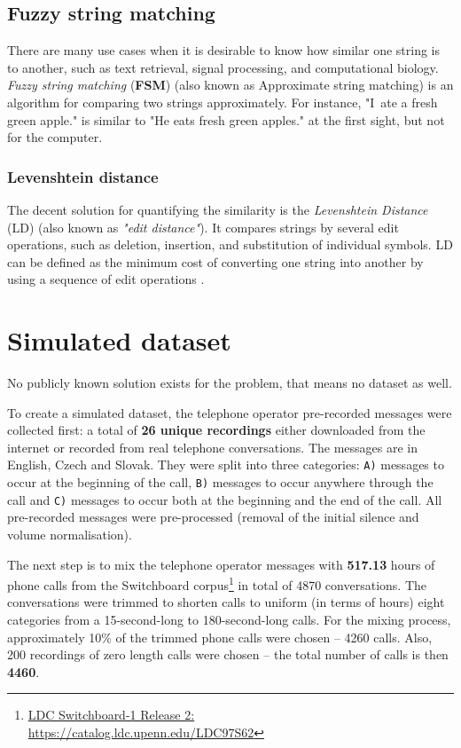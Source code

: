 \documentclass{ExcelAtFIT}
\begin{document}
\subsection{Fuzzy string matching}
There are many use cases when it is desirable to know how similar one string is to another, such as text retrieval, signal processing, and computational biology. \textit{Fuzzy string matching} (\textbf{FSM}) (also known as Approximate string matching) is an algorithm for comparing two strings approximately. For instance, "I~ate a fresh green apple." is similar to "He eats fresh green apples." at the first sight, but not for the computer. 

\subsubsection*{Levenshtein distance}
\label{LevenshteinDistance}
The decent solution for quantifying the similarity is the \textit{Levenshtein Distance} (LD) (also known as \textit{"edit distance"}). It compares strings by several edit operations, such as deletion, insertion, and substitution of individual symbols. LD can be defined as the minimum cost of converting one string into another by using a sequence of edit operations \cite{LevenshteinDist}.


\section{Simulated dataset}
No publicly known solution exists for the problem, that means no dataset as well.   

To create a simulated dataset, the telephone operator pre-recorded messages were collected first: a total of \textbf{26 unique recordings} either downloaded from the internet or recorded from real telephone conversations. The messages are in English, Czech and Slovak. They were split into three categories: \texttt{A)} messages to occur at the beginning of the call, \texttt{B)} messages to occur anywhere through the call and \texttt{C)} messages to occur both at the beginning and the end of the call. All pre-recorded messages were pre-processed (removal of the initial silence and volume normalisation).

The next step is to mix the telephone operator messages with \textbf{517.13} hours of phone calls from the Switchboard corpus\footnote{\href{https://catalog.ldc.upenn.edu/LDC97S62}{LDC Switchboard-1 Release 2:\\ https://catalog.ldc.upenn.edu/LDC97S62}} in total of 4870 conversations. The conversations were trimmed to shorten calls to uniform (in terms of hours) eight categories from a 15-second-long to 180-second-long calls. For the mixing process, approximately 10\% of the trimmed phone calls were chosen -- 4260 calls. Also, 200 recordings of zero length calls were chosen -- the total number of calls is then \textbf{4460}. 
\end{document}

